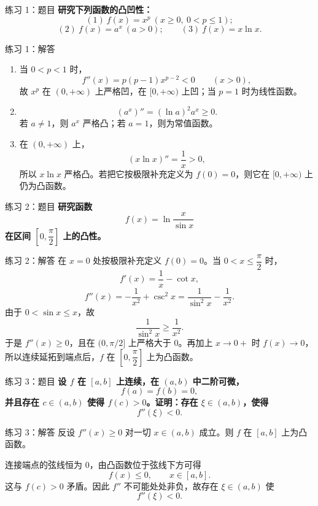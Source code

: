 \documentclass[aspectratio=169,11pt]{ctexbeamer}
\begin{document}
\begin{frame}{练习 1：题目}
\small
\textbf{研究下列函数的凸凹性：}
\[
  (1)\ f(x)=x^p\ (x\ge0,\ 0<p\le1);
\]
\[
  (2)\ f(x)=a^x\ (a>0);
  \qquad
  (3)\ f(x)=x\ln x.
\]
\end{frame}

\begin{frame}{练习 1：解答}
\small
\begin{enumerate}
  \item 当 $0<p<1$ 时，
  \[
    f''(x)=p(p-1)x^{p-2}<0\qquad (x>0),
  \]
  故 $x^p$ 在 $(0,+\infty)$ 上严格凹，在 $[0,+\infty)$ 上凹；当 $p=1$ 时为线性函数。
  \item
  \[
    (a^x)''=(\ln a)^2a^x\ge0.
  \]
  若 $a\ne1$，则 $a^x$ 严格凸；若 $a=1$，则为常值函数。
  \item 在 $(0,+\infty)$ 上，
  \[
    (x\ln x)''=\frac1x>0,
  \]
  所以 $x\ln x$ 严格凸。若把它按极限补充定义为 $f(0)=0$，则它在
  $[0,+\infty)$ 上仍为凸函数。
\end{enumerate}
\end{frame}

\begin{frame}{练习 2：题目}
\small
\textbf{研究函数}
\[
  f(x)=\ln\frac{x}{\sin x}
\]
\textbf{在区间 $\left[0,\dfrac{\pi}{2}\right]$ 上的凸性。}
\end{frame}

\begin{frame}{练习 2：解答}
\small
在 $x=0$ 处按极限补充定义 $f(0)=0$。当 $0<x\le\dfrac{\pi}{2}$ 时，
\[
  f'(x)=\frac1x-\cot x,
\]
\[
  f''(x)=-\frac1{x^2}+\csc^2 x
  =\frac1{\sin^2 x}-\frac1{x^2}.
\]
由于 $0<\sin x\le x$，故
\[
  \frac1{\sin^2 x}\ge \frac1{x^2}.
\]
于是 $f''(x)\ge0$，且在 $(0,\pi/2]$ 上严格大于 $0$。再加上
$x\to0+$ 时 $f(x)\to0$，所以连续延拓到端点后，$f$ 在
$\left[0,\dfrac{\pi}{2}\right]$ 上为凸函数。
\end{frame}

\begin{frame}{练习 3：题目}
\small
\textbf{设 $f$ 在 $[a,b]$ 上连续，在 $(a,b)$ 中二阶可微，}
\[
  f(a)=f(b)=0,
\]
\textbf{并且存在 $c\in(a,b)$ 使得 $f(c)>0$。证明：存在
$\xi\in(a,b)$，使得}
\[
  f''(\xi)<0.
\]
\end{frame}

\begin{frame}{练习 3：解答}
\small
反设 $f''(x)\ge0$ 对一切 $x\in(a,b)$ 成立。则 $f$ 在 $[a,b]$ 上为凸函数。

连接端点的弦线恒为 $0$，由凸函数位于弦线下方可得
\[
  f(x)\le0,\qquad x\in[a,b].
\]
这与 $f(c)>0$ 矛盾。因此 $f''$ 不可能处处非负，故存在
$\xi\in(a,b)$ 使
\[
  f''(\xi)<0.
\]
\end{frame}
\end{document}
